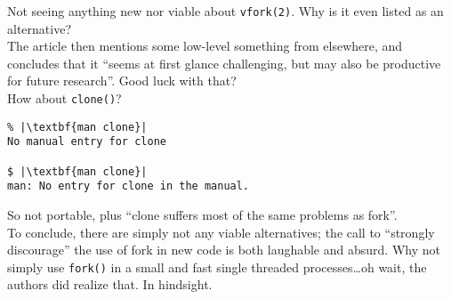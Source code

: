 \documentclass[10pt,a4paper]{article}
\begin{document}
Not seeing anything new nor viable about \texttt{vfork(2)}. Why is it
even listed as an alternative? \\

The article then mentions some low-level something from elsewhere,
and concludes that it ``seems at first glance challenging, but may
also be productive for future research''\citep[p.6]{Hotos2019}. Good
luck with that? \\

How about \texttt{clone()}?

\begin{lstlisting}
% |\textbf{man clone}|
No manual entry for clone

$ |\textbf{man clone}|
man: No entry for clone in the manual.
\end{lstlisting}

So not portable, plus ``clone suffers most of the same
problems as fork''\citep[p.6]{Hotos2019}. \\

To conclude, there are simply not any viable alternatives; the call to
``strongly discourage'' the use of fork in new code is both laughable
and absurd. Why not simply use \texttt{fork()} in a small and fast
single threaded processes\ldots oh wait, the authors did realize that.
In hindsight.


\end{document}
